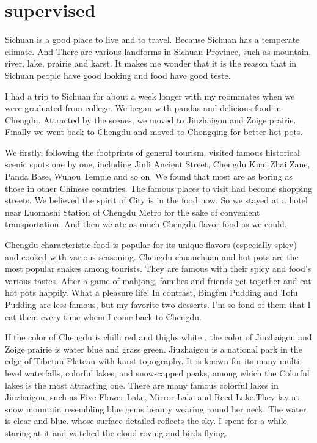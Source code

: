 \documentclass[UTF8]{article}
\begin{document}
\section{supervised}
\setlength{\baselineskip}{2cm}

Sichuan is a good place to live and to travel. Because Sichuan has a temperate climate.
And There are various landforms in Sichuan Province, such as mountain,  river, lake, prairie and karst.
It makes me wonder that it is the reason that in Sichuan people have good looking and food have good teste.

I had a trip to Sichuan for about a week longer with my roommates when we were graduated from college.
We began with pandas and delicious food in Chengdu. Attracted by the scenes, we moved to  Jiuzhaigou and Zoige prairie. Finally we went back to Chengdu and moved to Chongqing for better hot pots.

We firstly, following the footprints of general tourism, visited famous historical scenic spots one by one, including Jinli Ancient Street, Chengdu Kuai Zhai Zane, Panda Base, Wuhou Temple and so on. We found that most are as boring as those in other Chinese countries. The famous places to visit had become shopping streets. We believed the spirit of City is in the food now. So we stayed at a hotel near Luomashi Station of Chengdu Metro for the sake of convenient transportation. And then we ate as much Chengdu-flavor food as we could.

Chengdu characteristic food is popular for its unique flavors (especially spicy) and cooked with various seasoning. Chengdu chuanchuan and hot pots are the most popular snakes among tourists. They are famous with their spicy and food's various tastes. After a game of mahjong, families and friends get together and eat hot pots happily. What a pleasure life! In contrast, Bingfen Pudding and Tofu Pudding are less famous, but my favorite two desserts. I'm so fond of them that I eat them every time whem I come back to Chengdu. 

If the color of Chengdu is chilli red and thighs white , the color of Jiuzhaigou and Zoige prairie is water blue and grass green.
Jiuzhaigou is a national park in the edge of Tibetan Plateau with karst topography. It is known for its many multi-level waterfalls, colorful lakes, and snow-capped peaks, among which the Colorful lakes is  the most attracting one. There are many famous colorful lakes in Jiuzhaigou, such as  Five Flower Lake, Mirror Lake and Reed Lake.They lay at snow mountain resembling  blue gems beauty wearing round her neck. The water is clear and blue. whose surface detailed reflects the sky. I spent for a while staring at it and watched the cloud roving and birds flying. 
\end{document}
